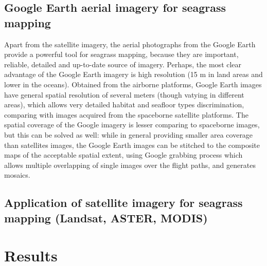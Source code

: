 \documentclass[10pt, a4paper]{article}
\begin{document}
\subsection{Google Earth aerial imagery for seagrass mapping}
Apart from the satellite imagery, the aerial photographs from the Google Earth provide
a powerful tool for seagrass mapping, because they are important, reliable, detailed
and up-to-date source of imagery.
Perhaps, the most clear advantage of the Google
Earth imagery is high resolution (15 m in land areas and lower in the oceans).
Obtained from the airborne platforms, Google Earth images have general spatial
resolution of several meters (though vatying in different areas), which allows very
detailed habitat and seafloor types discrimination, comparing with images
acquired from the spaceborne satellite platforms.
The spatial coverage of the Google imagery is lesser comparing to spaceborne images, but this can be solved as
well: while in general providing smaller area coverage than satellites images, the Google Earth
images can be stitched to the composite maps of the acceptable spatial extent, using Google grabbing
process which allows multiple overlapping of single images over the flight paths, and generates
mosaics.

\subsection{Application of satellite imagery for seagrass mapping (Landsat, ASTER, MODIS)}


\pagebreak
\section{Results}
\end{document}
